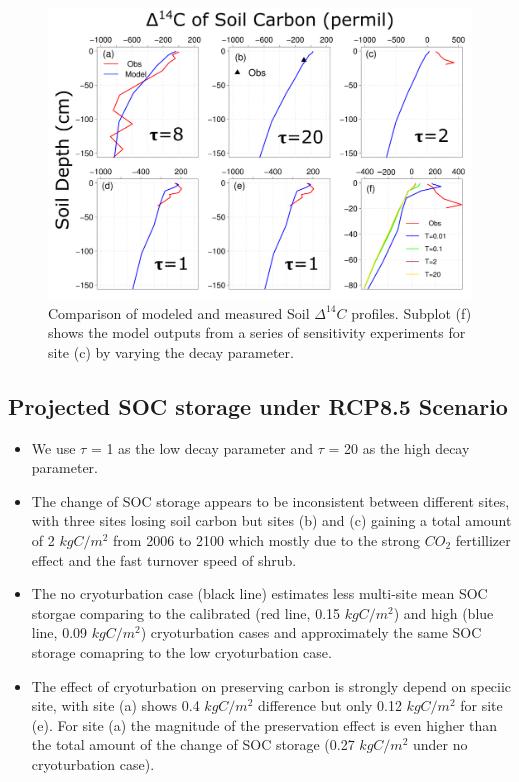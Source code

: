 \documentclass[portait,custom]{sciposter}
\begin{document}
\begin{multicols*}{4}
\begin{figure}
 \centering
 \includegraphics[width=0.9\columnwidth]{new_figures/Soil_D14_historical.png}
 \caption{Comparison of modeled and measured Soil $\Delta ^{14}C$ profiles. Subplot (f) shows the model outputs from a series of sensitivity experiments for site (c) by varying the decay parameter.}\label{fig:2014-2016_ENSO}
\end{figure}

\subsection*{Projected SOC storage under RCP8.5 Scenario}
\begin{itemize}
  \item We use $\tau$ = 1 as the low decay parameter and $\tau$ = 20 as the high decay parameter. 
  \item The change of SOC storage appears to be inconsistent between different sites, with three sites losing soil carbon but sites (b) and (c) gaining a total amount of 2 $kgC/m^2$ from 2006 to 2100 which mostly due to the strong $CO_2$ fertillizer effect and the fast turnover speed of shrub. 
  \item The no cryoturbation case (black line) estimates less multi-site mean SOC storgae comparing to the calibrated (red line, 0.15 $kgC/m^2$) and high (blue line, 0.09 $kgC/m^2$) cryoturbation cases and approximately the same SOC storage comapring to the low cryoturbation case. 
  \item The effect of cryoturbation on preserving carbon is strongly depend on speciic site, with site (a) shows 0.4 $kgC/m^2$ difference but only 0.12 $kgC/m^2$ for site (e). For site (a) the magnitude of the preservation effect is even higher than the total amount of the change of SOC storage (0.27 $kgC/m^2$ under no cryoturbation case).
\end{itemize}


\end{multicols*}
\end{document}
